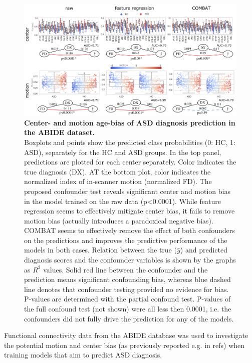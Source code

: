 \documentclass{article}
\begin{document}
\begin{figure}[!b]
  \centering
  \includegraphics[width=0.75\paperwidth]{fig/fig_abide.png}
  \caption{\textbf{Center- and motion age-bias of ASD diagnosis prediction in the ABIDE dataset.} \\
  Boxplots and points show the predicted class probabilities (0: HC, 1: ASD), separately for the HC and ASD groups. In the top panel, predictions are plotted for each center separately. Color indicates the true diagnosis (DX). AT the bottom plot, color indicates the normalized index of in-scanner motion (normalized FD). The proposed confounder test reveals significant center and motion bias in the model trained on the raw data (p<0.0001). While feature regression seems to effectively mitigate center bias, it fails to remove motion bias (actually introduces a paradoxical negative bias). COMBAT seems to effectively remove the effect of both confounders on the predictions and improves the predictive performance of the models in both cases.
  Relation between the true ($\hat{y}$) and predicted diagnosis scores and the confounder variables is shown by the graphs as $R^2$ values. Solid red line between the confounder and the prediction means significant confounding bias, whereas blue dashed line denotes that confounder testing provided no evidence for bias. P-values are determined with the partial confound test. P-values of the full confound test (not shown) were all less then 0.0001, i.e. the confounders did not fully drive the prediction for any of the models.
  }
  \label{fig:abide}
\end{figure}

Functional connectivity data from the ABIDE\citep{di2014autism} database was used to investigate the potential motion and center bias (as previously reported e.g. in refs\cite{spisak2014voxel, spisak2019optimal, gotts2013perils}) when training models that aim to predict ASD diagnosis.
\end{document}
